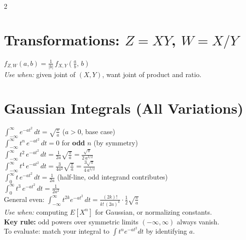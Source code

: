 \documentclass[10pt]{article}
\begin{document}
\begin{multicols*}{2}
\section{Transformations: $Z=XY$, $W=X/Y$}
$f_{Z,W}(a,b) = \frac{1}{|b|}\, f_{X,Y}\!\left(\frac{a}{b},\, b\right)$ \\
\textit{Use when:} given joint of $(X,Y)$, want joint of product and ratio.

\section{Gaussian Integrals (All Variations)}
$\int_{-\infty}^{\infty} e^{-at^2}\,dt = \sqrt{\frac{\pi}{a}}$ \quad ($a > 0$, base case) \\[2pt]
$\int_{-\infty}^{\infty} t^n\, e^{-at^2}\,dt = 0$ \quad for \textbf{odd} $n$ (by symmetry) \\[2pt]
$\int_{-\infty}^{\infty} t^2\, e^{-at^2}\,dt = \frac{1}{2a}\sqrt{\frac{\pi}{a}} = \frac{\sqrt{\pi}}{2\,a^{3/2}}$ \\[2pt]
$\int_{-\infty}^{\infty} t^4\, e^{-at^2}\,dt = \frac{3}{4a^2}\sqrt{\frac{\pi}{a}} = \frac{3\sqrt{\pi}}{4\,a^{5/2}}$ \\[2pt]
$\int_{0}^{\infty} t\, e^{-at^2}\,dt = \frac{1}{2a}$ \quad (half-line, odd integrand contributes) \\[2pt]
$\int_{0}^{\infty} t^3\, e^{-at^2}\,dt = \frac{1}{2a^2}$ \\[2pt]
General even: $\int_{-\infty}^{\infty} t^{2k} e^{-at^2}\,dt = \frac{(2k)!}{k!\,(2a)^k}\cdot\frac{1}{2}\sqrt{\frac{\pi}{a}}$ \\[2pt]
\textit{Use when:} computing $E[X^n]$ for Gaussian, or normalizing constants. \\
\textbf{Key rule:} odd powers over symmetric limits $(-\infty,\infty)$ always vanish. \\
To evaluate: match your integral to $\int t^n e^{-at^2}dt$ by identifying $a$.


\end{multicols*}
\end{document}
